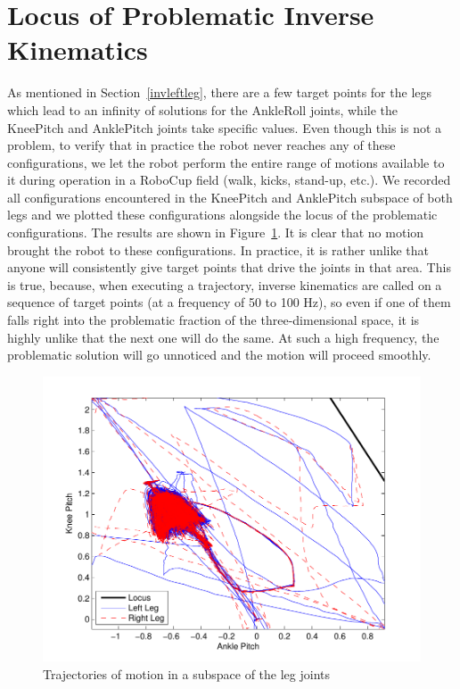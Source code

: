 \section{Locus of Problematic Inverse Kinematics}
\label{undefined}
As mentioned in Section~\ref{invleftleg}, there are a few target points for the legs which lead to an infinity of solutions for the AnkleRoll joints, while the KneePitch and AnklePitch joints take specific values. Even though this is not a problem, to verify that in practice the robot never reaches any of these configurations, we let the robot perform the entire range of motions available to it during operation in a RoboCup field (walk, kicks, stand-up, etc.). We recorded all configurations encountered in the KneePitch and AnklePitch subspace of both legs and we plotted these configurations alongside the locus of the problematic configurations. The results are shown in Figure~\ref{fig:undefined}. It is clear that no motion brought the robot to these configurations. In practice, it is rather unlike that anyone will consistently give target points that drive the joints in that area. This is true, because, when executing a trajectory, inverse kinematics are called on a sequence of target points (at a frequency of 50 to 100 Hz), so even if one of them falls right into the problematic fraction of the three-dimensional space, it is highly unlike that the next one will do the same. At such a high frequency, the problematic solution will go unnoticed and the motion will proceed smoothly.

\begin{figure}[h]
	\begin{center}
		\includegraphics[width=\textwidth]{Figures/undefined.pdf}
 		\caption{Trajectories of motion in a subspace of the leg joints}
 		\label{fig:undefined}
	\end{center}
\end{figure}

